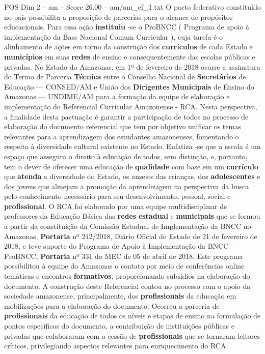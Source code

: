 \begin{textsample}{POS Dim 2 – am – Score 26.00 – am/am\_ef\_1.txt}
O pacto federativo constituído no país possibilita a proposição de parcerias para o alcance de propósitos educacionais.
Para essa ação \textbf{instituiu} -se o ProBNCC ( Programa de apoio à implementação da Base Nacional Comum Curricular ), cuja tarefa é o alinhamento de ações em torno da construção dos \textbf{currículos} de cada Estado e \textbf{municípios} em suas \textbf{redes} de ensino e consequentemente das escolas públicas e privadas.
No Estado do Amazonas, em 1º de fevereiro de 2018 ocorre a assinatura do Termo de Parceria \textbf{Técnica} entre o Conselho Nacional de \textbf{Secretários} de Educação — CONSED/AM e União dos \textbf{Dirigentes} \textbf{Municipais} de Ensino do Amazonas — UNDIME/AM para a formação da equipe de elaboração e implementação do Referencial Curricular Amazonense - RCA.
Nesta perspectiva, a finalidade desta pactuação é garantir a participação de todos no processo de elaboração do documento referencial que tem por objetivo unificar os temas relevantes para a aprendizagem dos estudantes amazonenses, fomentando o respeito à diversidade cultural existente no Estado.
Enfatiza -se que a escola é um espaço que assegura o direito à educação de todos, sem distinção, e, portanto, tem o dever de oferecer uma educação de \textbf{qualidade} com base em um \textbf{currículo} que \textbf{atenda} a diversidade do Estado, os anseios das crianças, dos \textbf{adolescentes} e dos jovens que almejam a promoção da aprendizagem na perspectiva da busca pelo conhecimento necessário para seu desenvolvimento, pessoal, social e \textbf{profissional}.
O RCA foi elaborado por uma equipe multidisciplinar de professores da Educação Básica das \textbf{redes} \textbf{estadual} e \textbf{municipais} que se formou a partir da constituição da Comissão Estadual de Implementação da BNCC no Amazonas, \textbf{Portaria} nº 242/2018, Diário Oficial do Estado de 21 de fevereiro de 2018, e teve suporte do Programa de Apoio à Implementação da BNCC - ProBNCC, \textbf{Portaria} nº 331 do MEC de 05 de abril de 2018.
Este programa possibilitou à equipe do Amazonas o contato por meio de conferências online temáticas e encontros \textbf{formativos}, proporcionando subsídios na elaboração do documento.
A construção deste Referencial contou no processo com o apoio da sociedade amazonense, principalmente, dos \textbf{profissionais} da educação em mobilizações para a elaboração do documento.
Ocorreu a parceria de \textbf{profissionais} da educação de todos os níveis e etapas de ensino na formulação de pontos específicos do documento, a contribuição de instituições públicas e privadas que colaboraram com a cessão de \textbf{profissionais} que se tornaram leitores críticos, privilegiando aspectos relevantes para enriquecimento do RCA.

\end{textsample}
